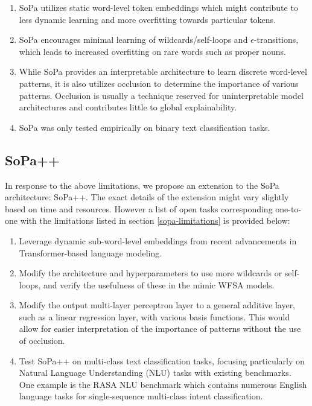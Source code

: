 \begin{enumerate}
  \item SoPa utilizes static word-level token embeddings which might contribute
  to less dynamic learning and more overfitting towards particular tokens.
  \item SoPa encourages minimal learning of wildcards/self-loops and
  $\epsilon$-transitions, which leads to increased overfitting on rare words
  such as proper nouns.
  \item While SoPa provides an interpretable architecture to learn discrete
  word-level patterns, it is also utilizes occlusion to determine the importance
  of various patterns. Occlusion is usually a technique reserved for
  uninterpretable model architectures and contributes little to global
  explainability.
  \item SoPa was only tested empirically on binary text classification tasks.
\end{enumerate}

\subsection{SoPa++}

In response to the above limitations, we propose an extension to the SoPa
architecture: SoPa++. The exact details of the extension might vary slightly
based on time and resources. However a list of open tasks corresponding
one-to-one with the limitations listed in section \ref{sopa-limitations} is
provided below:

\begin{enumerate}
  \item Leverage dynamic sub-word-level embeddings from recent advancements in
  Transformer-based language modeling.
  \item Modify the architecture and hyperparameters to use more wildcards or
  self-loops, and verify the usefulness of these in the mimic WFSA models.
  \item Modify the output multi-layer perceptron layer to a general additive
  layer, such as a linear regression layer, with various basis functions. This
  would allow for easier interpretation of the importance of patterns without
  the use of occlusion.
  \item Test SoPa++ on multi-class text classification tasks, focusing
  particularly on Natural Language Understanding (NLU) tasks with existing
  benchmarks. One example is the RASA NLU benchmark \citep{bocklisch2017rasa}
  which contains numerous English language tasks for single-sequence multi-class
  intent classification.
\end{enumerate}

